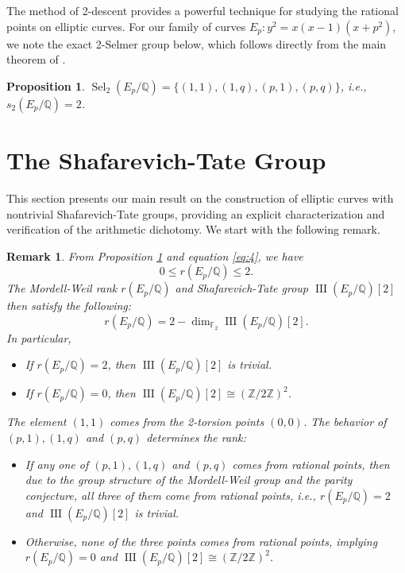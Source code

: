\documentclass[10pt]{article}
\DeclareMathOperator{\III}{III}
\newtheorem{proposition}[theorem]{Proposition}
\newtheorem{remark}[theorem]{Remark}
\begin{document}
The method of 2-descent provides a powerful technique for studying the rational points on elliptic curves. For our family of curves \(E_{p}: y^{2} = x(x-1)(x+p^{2})\), we note the exact 2-Selmer group below, which follows directly from the main theorem of \cite{9}.

\begin{proposition}\label{prop:selmer}
\(\operatorname{Sel}_{2}(E_{p}/\mathbb{Q}) = \{(1,1), (1,q), (p,1), (p,q)\}\), i.e., \(s_{2}(E_{p}/\mathbb{Q}) = 2\).
\end{proposition}

\section{The Shafarevich-Tate Group}

This section presents our main result on the construction of elliptic curves with nontrivial Shafarevich-Tate groups, providing an explicit characterization and verification of the arithmetic dichotomy. We start with the following remark.

\begin{remark}\label{rem:dichotomy}
From Proposition \ref{prop:selmer} and equation \eqref{eq:4}, we have
\[0 \leq r(E_{p}/\mathbb{Q}) \leq 2.\]
The Mordell-Weil rank \(r(E_{p}/\mathbb{Q})\) and Shafarevich-Tate group \(\III(E_{p}/\mathbb{Q})[2]\) then satisfy the following:
\[r(E_{p}/\mathbb{Q}) = 2 - \dim_{\mathbb{F}_{2}} \III(E_{p}/\mathbb{Q})[2].\]
In particular,
\begin{itemize}
\item If \(r(E_{p}/\mathbb{Q}) = 2\), then \(\III(E_{p}/\mathbb{Q})[2]\) is trivial.
\item If \(r(E_{p}/\mathbb{Q}) = 0\), then \(\III(E_{p}/\mathbb{Q})[2] \cong (\mathbb{Z}/2\mathbb{Z})^{2}\).
\end{itemize}
The element \((1,1)\) comes from the 2-torsion points \((0,0)\). The behavior of \((p,1), (1,q)\) and \((p,q)\) determines the rank:
\begin{itemize}
\item If any one of \((p,1), (1,q)\) and \((p,q)\) comes from rational points, then due to the group structure of the Mordell-Weil group and the parity conjecture, all three of them come from rational points, i.e., \(r(E_{p}/\mathbb{Q}) = 2\) and \(\III(E_{p}/\mathbb{Q})[2]\) is trivial.
\item Otherwise, none of the three points comes from rational points, implying \(r(E_{p}/\mathbb{Q}) = 0\) and \(\III(E_{p}/\mathbb{Q})[2] \cong (\mathbb{Z}/2\mathbb{Z})^{2}\).
\end{itemize}
\end{remark}
\end{document}
